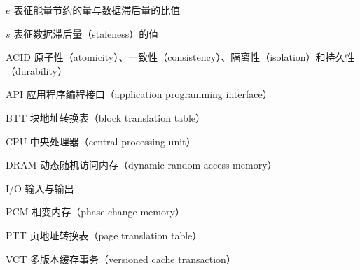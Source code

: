 \begin{denotation}
\item[$e$] 表征能量节约的量与数据滞后量的比值
\item[$s$] 表征数据滞后量（staleness）的值
\item[ACID] 原子性（atomicity）、一致性（consistency）、隔离性（isolation）和持久性（durability）
\item[API] 应用程序编程接口（application programming interface）
\item[BTT] 块地址转换表（block translation table）
\item[CPU] 中央处理器（central processing unit）
\item[DRAM] 动态随机访问内存（dynamic random access memory）
\item[I/O] 输入与输出
\item[PCM] 相变内存（phase-change memory）
\item[PTT] 页地址转换表（page translation table）
\item[VCT] 多版本缓存事务（versioned cache transaction）
\end{denotation}

